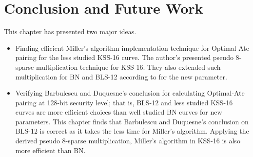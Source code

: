 \section{Conclusion and Future Work}
This chapter has presented two major ideas.
\begin{itemize}
\item Finding efficient Miller's algorithm implementation technique for Optimal-Ate pairing for the less studied KSS-16 curve. The author's presented pseudo 8-sparse multiplication technique for KSS-16. They also extended such multiplication for BN and BLS-12 according to \cite{PAIRING:MANS13} for the new parameter. 
\item Verifying Barbulescu and Duquesne's conclusion \cite{EPRINT:BarDuq17} for calculating Optimal-Ate pairing at 128-bit security level; that is, BLS-12 and less studied KSS-16 curves are more efficient choices than well studied BN curves for new parameters. 
This chapter finds that Barbulescu and Duquesne's conclusion on BLS-12 is correct as it takes the less time for Miller's algorithm.
Applying the derived pseudo 8-sparse multiplication, Miller's algorithm in KSS-16 is also more efficient than BN.
\end{itemize}
